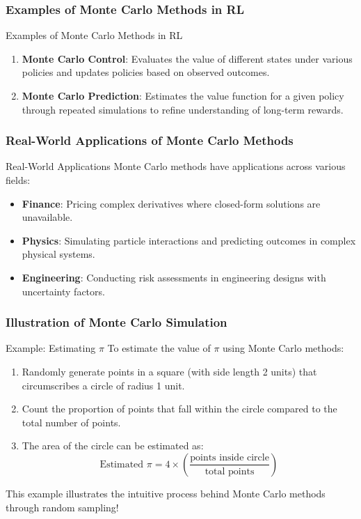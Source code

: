 \documentclass[aspectratio=169]{beamer}
\begin{document}
\begin{frame}[fragile]
    \frametitle{Examples of Monte Carlo Methods in RL}
    \begin{block}{Examples of Monte Carlo Methods in RL}
        \begin{enumerate}
            \item \textbf{Monte Carlo Control}: Evaluates the value of different states under various policies and updates policies based on observed outcomes.
            \item \textbf{Monte Carlo Prediction}: Estimates the value function for a given policy through repeated simulations to refine understanding of long-term rewards.
        \end{enumerate}
    \end{block}
\end{frame}

\begin{frame}[fragile]
    \frametitle{Real-World Applications of Monte Carlo Methods}
    \begin{block}{Real-World Applications}
        Monte Carlo methods have applications across various fields:
        \begin{itemize}
            \item \textbf{Finance}: Pricing complex derivatives where closed-form solutions are unavailable.
            \item \textbf{Physics}: Simulating particle interactions and predicting outcomes in complex physical systems.
            \item \textbf{Engineering}: Conducting risk assessments in engineering designs with uncertainty factors.
        \end{itemize}
    \end{block}
\end{frame}

\begin{frame}[fragile]
    \frametitle{Illustration of Monte Carlo Simulation}
    \begin{block}{Example: Estimating \(\pi\)}
        To estimate the value of \(\pi\) using Monte Carlo methods:
        \begin{enumerate}
            \item Randomly generate points in a square (with side length 2 units) that circumscribes a circle of radius 1 unit.
            \item Count the proportion of points that fall within the circle compared to the total number of points.
            \item The area of the circle can be estimated as:
            \begin{equation}
                \text{Estimated } \pi = 4 \times \left(\frac{\text{points inside circle}}{\text{total points}}\right)
            \end{equation}
        \end{enumerate}
        This example illustrates the intuitive process behind Monte Carlo methods through random sampling!
    \end{block}
\end{frame}
\end{document}
